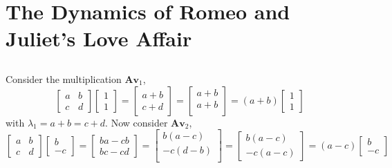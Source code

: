 \documentclass[]{article}
\numberwithin{equation}{section}
\begin{document}

\section{The Dynamics of Romeo and Juliet's Love Affair} 

\subsection{}

Consider the multiplication \(\mathbf{Av}_1\), 
\begin{equation}
	\begin{bmatrix}
	a & b \\
	c & d
	\end{bmatrix}
	\begin{bmatrix}
	1 \\
	1
	\end{bmatrix}
	=
	\begin{bmatrix}
	a + b \\
	c + d
	\end{bmatrix}
	=
	\begin{bmatrix}
	a + b \\
	a + b \\
	\end{bmatrix}
	=
	(a + b)\begin{bmatrix}
	1 \\
	1
	\end{bmatrix}
\end{equation}
with \(\lambda_1 = a + b = c + d\). Now consider \(\mathbf{Av}_2\), 
\begin{equation}
	\begin{bmatrix}
	a & b \\
	c & d
	\end{bmatrix}
	\begin{bmatrix}
	b \\
	-c
	\end{bmatrix}
	=
	\begin{bmatrix}
	ba - cb \\
	bc - cd
	\end{bmatrix}
	=
	\begin{bmatrix}
	b(a - c) \\
	-c(d - b) \\
	\end{bmatrix}
	=
	\begin{bmatrix}
	b(a - c) \\
	-c(a - c)
	\end{bmatrix}
	=
	(a - c)\begin{bmatrix}
	b \\
	-c
	\end{bmatrix}
\end{equation}
\end{document}
